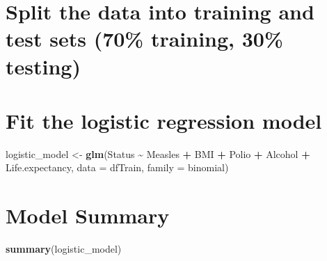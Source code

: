 \documentclass[
]{article}
\newenvironment{Shaded}{\begin{snugshade}}{\end{snugshade}}
\newcommand{\AttributeTok}[1]{\textcolor[rgb]{0.13,0.29,0.53}{#1}}
\newcommand{\ConstantTok}[1]{\textcolor[rgb]{0.56,0.35,0.01}{#1}}
\newcommand{\DecValTok}[1]{\textcolor[rgb]{0.00,0.00,0.81}{#1}}
\newcommand{\FunctionTok}[1]{\textcolor[rgb]{0.13,0.29,0.53}{\textbf{#1}}}
\newcommand{\NormalTok}[1]{#1}
\newcommand{\OtherTok}[1]{\textcolor[rgb]{0.56,0.35,0.01}{#1}}
\newcommand{\SpecialCharTok}[1]{\textcolor[rgb]{0.81,0.36,0.00}{\textbf{#1}}}
\begin{document}
\section{Split the data into training and test sets (70\% training, 30\%
testing)}\label{split-the-data-into-training-and-test-sets-70-training-30-testing}

\begin{Shaded}
\end{Shaded}

\section{Fit the logistic regression
model}\label{fit-the-logistic-regression-model}

\begin{Shaded}
\begin{Highlighting}[]
\NormalTok{logistic\_model }\OtherTok{\textless{}{-}} \FunctionTok{glm}\NormalTok{(Status }\SpecialCharTok{\textasciitilde{}}\NormalTok{ Measles }\SpecialCharTok{+}\NormalTok{ BMI }\SpecialCharTok{+}\NormalTok{ Polio }\SpecialCharTok{+}\NormalTok{ Alcohol }\SpecialCharTok{+}\NormalTok{ Life.expectancy, }
                      \AttributeTok{data =}\NormalTok{ dfTrain, }
                      \AttributeTok{family =}\NormalTok{ binomial)}
\end{Highlighting}
\end{Shaded}

\section{Model Summary}\label{model-summary-1}

\begin{Shaded}
\begin{Highlighting}[]
\FunctionTok{summary}\NormalTok{(logistic\_model)}
\end{Highlighting}
\end{Shaded}
\end{document}
